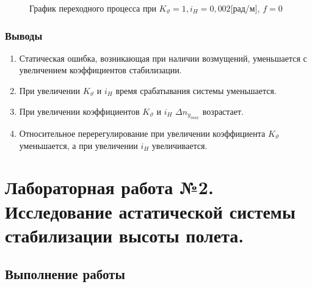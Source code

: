     \begin{figure}[H]
        \caption{График переходного процесса при $K_{\vartheta}=1, i_H=0,002$[рад/м], $f=0$}
        \label{fig:Переходный процесс 2}
    \end{figure}

    \subsubsection{Выводы}
    \begin{enumerate}
        \item Статическая ошибка, возникающая при наличии возмущений, уменьшается с увеличением коэффициентов стабилизации.
        \item При увеличении $K_{\vartheta}$  и $i_H$ время срабатывания системы уменьшается.
        \item При увеличении коэффициентов $K_{\vartheta}$  и $i_H$ $\Delta n_{y_{max}}$ возрастает. 
        \item Относительное перерегулирование при увеличении коэффициента $K_{\vartheta}$ уменьшается, а при увеличении $i_H$ увеличивается.
    \end{enumerate}

\section{Лабораторная работа №2. Исследование астатической системы стабилизации высоты полета.}
    \subsection{Выполнение работы}
